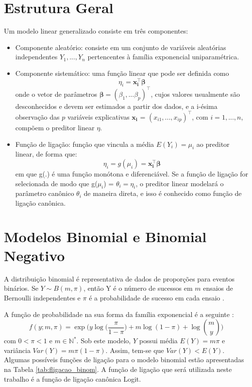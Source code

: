 \documentclass[12pt, a4paper, twoside]{report}
\numberwithin{equation}{section} %
\begin{document}
\section{Estrutura Geral}
Um modelo linear generalizado consiste em três componentes: 

\begin{itemize}
    \item Componente aleatório: consiste em um conjunto de variáveis aleatórias independentes $Y_1,...,Y_n$ pertencentes à família exponencial uniparamétrica. 
    \item Componente sistemático: uma função linear que pode ser definida como 
        \begin{equation}
         \eta_i = \boldsymbol{x_{i}^\top\beta}
        \end{equation}
onde o vetor de parâmetros $\boldsymbol{\beta} = (\beta_1,...\beta_p)^\top$, cujos valores usualmente são desconhecidos e devem ser estimados a partir dos dados, e a i-ésima observação das $p$ variáveis explicativas $\boldsymbol{x_i}$ = $(x_{i1},...,x_{ip})^\top$, com $i=1, ..., n$, compõem o preditor linear $\eta$.
    \item Função de ligação:  função que vincula a média $E(Y_i)=\mu_i$ ao preditor linear, de forma que:
      \begin{equation}
         \eta_{i} = g(\mu_i)  = \boldsymbol{x_i^\top\beta}
        \end{equation}
em que g(.) é uma função monótona e diferenciável. Se a função de ligação for selecionada de modo que g($\mu_{i}$) = $\theta_i = \eta_i$, o preditor linear modelará o parâmetro canônico $\theta_i$ de maneira direta, e isso é conhecido como função de ligação canônica.    \end{itemize}

\section{Modelos Binomial e Binomial Negativo}

A distribuição binomial é representativa de dados de proporções para eventos binários. Se $Y\sim B(m,\pi)$, então Y é o número de sucessos em $m$ ensaios de Bernoulli independentes e $\pi$ é a probabilidade de sucesso em cada ensaio \citep{dobson2008introduction}.

A função de probabilidade na sua forma da família exponencial é a seguinte \citep{dobson2008introduction}:
\begin{equation}\label{fp_binom}
f(y;m,\pi)=\exp{\biggl(  y \log\biggl(  \frac{\pi}{1-\pi} \biggl)+m \log(1-\pi)+ \log {\binom{m}{y}} \biggl)}
\end{equation}
com $0<\pi<1$ e $m \in \mathbb{N^*}$. Sob este modelo, $Y$ possui média $E(Y)=m \pi$ e variância $Var(Y)=m \pi (1-\pi)$. Assim, tem-se que $Var(Y)<E(Y)$. Algumas possíveis funções de ligação para o modelo binomial estão apresentadas na Tabela \ref{tab:fligacao_binom}. A função de ligação que será utilizada neste trabalho é a função de ligação canônica Logit.
\end{document}
